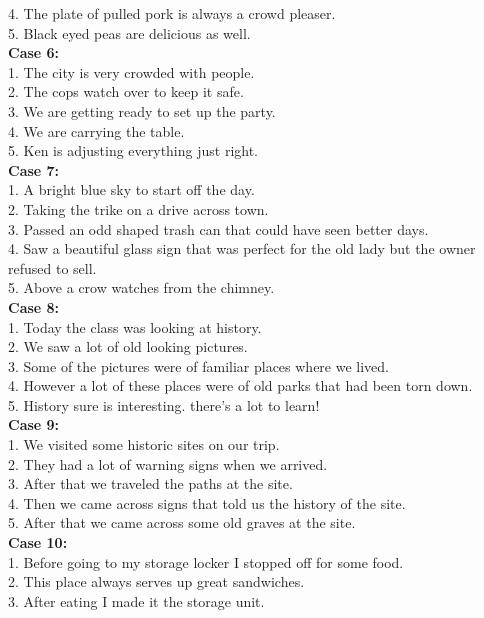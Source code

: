 \documentclass[10pt,twocolumn,letterpaper]{article}
\begin{document}
{{4. The plate of pulled pork is always a crowd pleaser.\\
5. Black eyed peas are delicious as well.\\
\textbf{Case 6:}\\
1. The city is very crowded with people.\\
2. The cops watch over to keep it safe.\\
3. We are getting ready to set up the party.\\
4. We are carrying the table.\\
5. Ken is adjusting everything just right.\\
\textbf{Case 7:}\\
1. A bright blue sky to start off the day.\\
2. Taking the trike on a drive across town.\\
3. Passed an odd shaped trash can that could have seen better days.\\
4. Saw a beautiful glass sign that was perfect for the old lady but the owner refused to sell.\\
5. Above a crow watches from the chimney.\\
\textbf{Case 8:}\\
1. Today the class was looking at history.\\
2. We saw a lot of old looking pictures.\\
3. Some of the pictures were of familiar places where we lived.\\
4. However a lot of these places were of old parks that had been torn down.\\
5. History sure is interesting. there's a lot to learn!\\
\textbf{Case 9:}\\
1. We visited some historic sites on our trip.\\
2. They had a lot of warning signs when we arrived.\\
3. After that we traveled the paths at the site.\\
4. Then we came across signs that told us the history of the site.\\
5. After that we came across some old graves at the site.\\
\textbf{Case 10:}\\
1. Before going to my storage locker I stopped off for some food.\\
2. This place always serves up great sandwiches.\\
3. After eating I made it the storage unit.\\
}}
\end{document}
